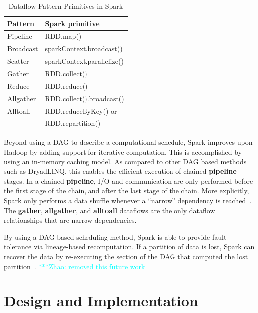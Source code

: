 \documentclass[10pt, conference, compsocconf]{IEEEtran}
\newcommand{\zhaonote}[1]{{\textcolor{cyan}    { ***Zhao:      #1 }}}
\newcommand{\zhaonote}[1]{}
\newcommand{\up}{\vspace*{-1em}}
\begin{document}
\begin{table}[h]
  \begin{center}
  \caption{Dataflow Pattern Primitives in Spark}
    \begin{small}
    \begin{tabular}{ | p{1.8cm} | p{5.5cm} |}
    \hline
    Pattern & Spark primitive \\
    \hline \hline
    Pipeline & RDD.map()  \\ 
    Broadcast & sparkContext.broadcast() \\   
    Scatter & sparkContext.parallelize() \\ 
    Gather & RDD.collect() \\ 
    Reduce & RDD.reduce() \\ 
    Allgather & RDD.collect().broadcast() \\ 
    Alltoall & RDD.reduceByKey() or \\
 & RDD.repartition() \\ 
    \hline
    \end{tabular}
    \end{small}   
  \label{tb:Patterns}     	
  \end{center}
\end{table}

\up
Beyond using a DAG to describe a computational schedule, Spark improves upon
Hadoop by adding support for iterative computation. This is accomplished by using an
in-memory caching model. As compared to other DAG based methods such as DryadLINQ, this enables
the efficient execution of chained \textbf{pipeline} stages. In a chained \textbf{pipeline},
I/O and communication are only performed before the first stage of the chain, and after the
last stage of the chain. More explicitly, Spark only performs a data shuffle whenever a
``narrow'' dependency is reached~\cite{zaharia12}. The \textbf{gather}, \textbf{allgather},
and \textbf{alltoall} dataflows are the only dataflow relationships that are narrow dependencies.

By using a DAG-based scheduling method, Spark is able to provide fault tolerance via
lineage-based recomputation. If a partition of data is lost, Spark can recover the data
by re-executing the section of the DAG that computed the lost partition~\cite{zaharia12}. 
\zhaonote{removed this future work}

\section{Design and Implementation}
\label{sec:Design}
\end{document}
